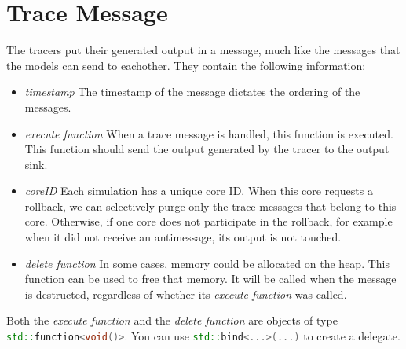 \documentclass[12pt]{article}
\newcommand{\inlinecpp}[1]{\lstinline[language=c++]{#1}}
\begin{document}
\section{Trace Message}
The tracers put their generated output in a message, much like the messages that the models can send to eachother. They contain the following information:
\begin{itemize}
	\item \emph{timestamp} The timestamp of the message dictates the ordering of the messages.
	\item \emph{execute function} When a trace message is handled, this function is executed. This function should send the output generated by the tracer to the output sink.
	\item \emph{coreID} Each simulation has a unique core ID. When this core requests a rollback, we can selectively purge only the trace messages that belong to this core. Otherwise, if one core does not participate in the rollback, for example when it did not receive an antimessage, its output is not touched.
	\item \emph{delete function} In some cases, memory could be allocated on the heap. This function can be used to free that memory. It will be called when the message is destructed, regardless of whether its \emph{execute function} was called.
\end{itemize}
Both the \emph{execute function} and the \emph{delete function} are objects of type \inlinecpp{std::function<void()>}. You can use \inlinecpp{std::bind<...>(...)} to create a delegate.
\end{document}
